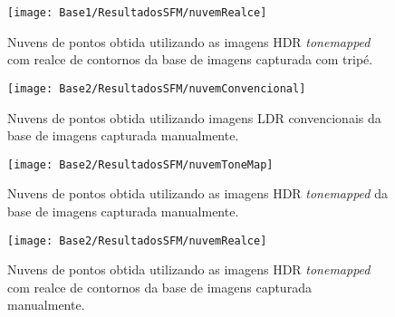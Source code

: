 \begin{figure}[H]
  \centering 
  \texttt{[image: Base1/ResultadosSFM/nuvemRealce]}
  \caption{Nuvens de pontos obtida utilizando as imagens HDR \textit{tonemapped} com realce de contornos da base de imagens capturada com tripé.}
  \label{figNuvemPontosC}
\end{figure}

\begin{figure}[H]
  \centering 
  \texttt{[image: Base2/ResultadosSFM/nuvemConvencional]}
  \caption{Nuvens de pontos obtida utilizando imagens LDR convencionais da base de imagens capturada manualmente.}
  \label{figNuvemPontos2A}
\end{figure}

\begin{figure}[H]
  \centering 
  \texttt{[image: Base2/ResultadosSFM/nuvemToneMap]}
  \caption{Nuvens de pontos obtida utilizando as imagens HDR \textit{tonemapped} da base de imagens capturada manualmente.}
  \label{figNuvemPontos2B}
\end{figure}

\begin{figure}[H]
  \centering 
  \texttt{[image: Base2/ResultadosSFM/nuvemRealce]}
  \caption{Nuvens de pontos obtida utilizando as imagens HDR \textit{tonemapped} com realce de contornos da base de imagens capturada manualmente.}
  \label{figNuvemPontos2C}
\end{figure}